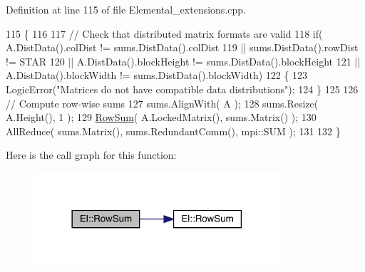 Definition at line 115 of file Elemental\+\_\+extensions.\+cpp.


\begin{DoxyCode}
115                                                                          \{
116   
117   \textcolor{comment}{// Check that distributed matrix formats are valid}
118   \textcolor{keywordflow}{if}( A.DistData().colDist != sums.DistData().colDist
119       || sums.DistData().rowDist != STAR 
120       || A.DistData().blockHeight != sums.DistData().blockHeight
121       || A.DistData().blockWidth != sums.DistData().blockWidth)
122   \{
123       LogicError(\textcolor{stringliteral}{"Matrices do not have compatible data distributions"});
124   \}
125 
126   \textcolor{comment}{// Compute row-wise sums}
127   sums.AlignWith( A );
128   sums.Resize( A.Height(), 1 );
129   \hyperlink{namespaceEl_a3982e90cd0f7cbfdc0f19741ce254c1a}{RowSum}( A.LockedMatrix(), sums.Matrix() );
130   AllReduce( sums.Matrix(), sums.RedundantComm(), mpi::SUM );
131 
132 \}
\end{DoxyCode}
Here is the call graph for this function\+:\nopagebreak
\begin{figure}[H]
\begin{center}
\leavevmode
\includegraphics[width=258pt]{namespaceEl_a3982e90cd0f7cbfdc0f19741ce254c1a_cgraph}
\end{center}
\end{figure}
